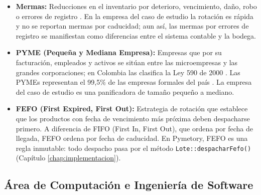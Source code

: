 \begin{itemize}
    \item \textbf{Mermas:} Reducciones en el inventario por deterioro, vencimiento, daño, robo o errores de registro \cite{ballou2004logistica}. En la empresa del caso de estudio la rotación es rápida y no se reportan mermas por caducidad; aun así, las mermas por errores de registro se manifiestan como diferencias entre el sistema contable y la bodega.
    
    \item \textbf{PYME (Pequeña y Mediana Empresa):} Empresas que por su facturación, empleados y activos se sitúan entre las microempresas y las grandes corporaciones; en Colombia las clasifica la Ley 590 de 2000 \cite{ley590}. Las PYMEs representan el 99,5\% de las empresas formales del país \cite{bbva2024mipymes}. La empresa del caso de estudio es una panificadora de tamaño pequeño a mediano.
    
    \item \textbf{FEFO (First Expired, First Out):} Estrategia de rotación que establece que los productos con fecha de vencimiento más próxima deben despacharse primero. A diferencia de FIFO (First In, First Out), que ordena por fecha de llegada, FEFO ordena por fecha de caducidad. En Pymetory, FEFO es una regla inmutable: todo despacho pasa por el método \texttt{Lote::despacharFefo()} (Capítulo \ref{chap:implementacion}).
\end{itemize}

\subsection*{Área de Computación e Ingeniería de Software}

